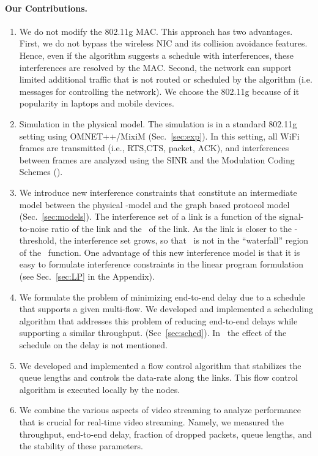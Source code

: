 \documentclass[12pt]{article}
\newenvironment{proof sketch}[1]{\noindent {\emph{Proof sketch of #1:}}}{\hfill \qed}
\newcommand{\SINR}{\text{\sc{sinr}}}
\newcommand{\PER}{\text{\sc{per}}}
\newcommand{\MCS}{\text{\sc{mcs}}}
\begin{document}
\paragraph{Our Contributions.}
\begin{enumerate}
\item We do not modify the 802.11g MAC. This approach has two
  advantages. First, we do not bypass the wireless NIC and its
  collision avoidance features. Hence, even if the algorithm suggests
  a schedule with interferences, these interferences are resolved by
  the MAC. Second, the network can support limited additional traffic
  that is not routed or scheduled by the algorithm (i.e. messages for
  controlling the network). We choose the 802.11g because of it
  popularity in laptops and mobile devices.
\item Simulation in the physical model. The simulation is in a
  standard 802.11g setting using OMNET++/MixiM (Sec.~\ref{sec:exp}).
  In this setting, all WiFi frames are transmitted (i.e., RTS,CTS,
  packet, ACK), and interferences between frames are analyzed using
  the SINR and the  Modulation Coding Schemes (\MCS).
\item We introduce new interference constraints that constitute an
  intermediate model between the physical \SINR-model and the graph
  based protocol model (Sec.~\ref{sec:models}). The interference set
  of a link is a function of the signal-to-noise ratio of the link and
  the \MCS\ of the link.  As the link is closer to the
  \SINR-threshold, the interference set grows, so that \SINR\ is not
  in the ``waterfall'' region of the \PER\ function.  One advantage of
  this new interference model is that it is easy to formulate
  interference constraints in the linear program formulation
  (see Sec.~\ref{sec:LP} in the Appendix).
\item We formulate the problem of minimizing end-to-end delay due to a
  schedule that supports a given multi-flow. We developed and
  implemented a scheduling algorithm that addresses this problem of
  reducing end-to-end delays while supporting a similar throughput.
  (Sec~\ref{sec:sched}).
  In~\cite{kumar2005algorithmic,alicherry2005joint11,buragohain2007improved}
  the effect of the schedule on the delay is not mentioned.
\item We developed and implemented a flow control algorithm that
  stabilizes the queue lengths and controls the data-rate along the
  links.  This flow control algorithm is executed locally by the
  nodes.
\item We combine the various aspects of video streaming to analyze
  performance that is crucial for real-time video streaming.  Namely,
  we measured the throughput, end-to-end delay, fraction of dropped
  packets, queue lengths, and the stability of these parameters.
\end{enumerate}
\end{document}
